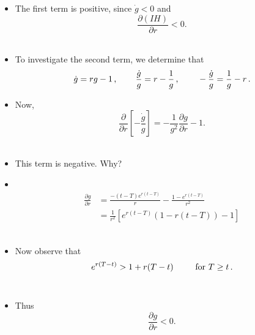 \documentclass[12pt,compress,handout]{beamer}  %
\begin{document}
\begin{frame}

\begin{itemize}
\item The first term is positive, since $\dot{g}<0$ and
\begin{equation*}
\frac{\partial (IH)}{\partial r}<0\text{.}
\end{equation*}\ \\[9mm]
\item To investigate the second term, we determine that
\begin{equation*}
\dot{g}=rg-1\,\text{,}\hspace{8mm}
\frac{\dot{g}}{g}=r-\frac{1}{g}\,\text{,}\hspace{8mm}
-\frac{\dot{g}}{g}=\frac{1}{g}-r\,\text{.}
\end{equation*}
\end{itemize}

\end{frame}


\begin{frame}

\begin{itemize}
\item Now,
\begin{equation*}
\frac{\partial }{\partial r}\left[ -\frac{\dot{g}}{g}\right]
=-\frac{1}{g^2}\frac{\partial g}{\partial r}-1\text{.}
\end{equation*}\ \\[11mm]
\item This term is negative. Why?
\end{itemize}

\end{frame}


\begin{frame}

\begin{itemize}
\item \ \\[-12mm]
\begin{align*}
\frac{\partial g}{\partial r} & =\frac{-(t-T)e^{r(t-T)}}{r}-\frac{1-e^{r(t-T)}}{r^2}\\[3mm]
& =\frac{1}{r^2}\left[ e^{r(t-T)}\left( 1-r(t-T)\right) -1\right]
\end{align*}\ \\[3mm]
\item Now observe that
\begin{equation*}
e^{r(T-t)}>1+r(T-t)\hspace{9mm}\text{for }T\geq t\,\text{.}
\end{equation*}\ \\[3mm]
\item Thus
\begin{equation*}
\frac{\partial g}{\partial r}<0\text{.}
\end{equation*}
\end{itemize}

\end{frame}
\end{document}
